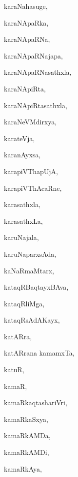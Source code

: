 \begin{multicols}{3}
{\noindent
{karaNahasuge}, \pageref{karaNahasuge}

\noindent
{karaNApaRka}, \pageref{karaNApaRka}

\noindent
{karaNApaRNa}, \pageref{karaNApaRNa}

\noindent
{karaNApaRNajapa}, \pageref{karaNApaRNajapa}

\noindent
{karaNApaRNasathxla}, \pageref{karaNApaRNasathxla}

\noindent
{karaNApiRta}, \pageref{karaNApiRta}

\noindent
{karaNApiRtasathxla}, \pageref{karaNApiRtasathxla}

\noindent
{karaNeVMdirxya}, \pageref{karaNeVMdirxya}

\noindent
{karateVja}, \pageref{karateVja}

\noindent
{karanAyxsa}, \pageref{karanAyxsa}

\noindent
{karapiVThapUjA}, \pageref{karapiVThapUjA}

\noindent
{karapiVThAcaRne}, \pageref{karapiVThAcaRne}

\noindent
{karasathxla}, \pageref{karasathxla}

\noindent
{karasathxLa}, \pageref{karasathxLa}

\noindent
{karuNajala}, \pageref{karuNajala}

\noindent
{karuNaparxsAda}, \pageref{karuNaparxsAda}

\noindent
{kaNaRmaMtarx}, \pageref{kaNaRmaMtarx}

\noindent
{kataqRBaqtayxBAva}, \pageref{kataqRBaqtayxBAva}

\noindent
{kataqRliMga}, \pageref{kataqRliMga}

\noindent
{kataqRsAdAKayx}, \pageref{kataqRsAdAKayx}

\noindent
{katARra}, \pageref{katARra}

\noindent
{katARrana kamamxTa}, \pageref{katARrana kamamxTa}

\noindent
{katuR}, \pageref{katuR}

\noindent
{kamaR}, \pageref{kamaR}

\noindent
{kamaRkaqtashariVri}, \pageref{kamaRkaqtashariVri}

\noindent
{kamaRkaSxya}, \pageref{kamaRkaSxya}

\noindent
{kamaRkAMDa}, \pageref{kamaRkAMDa}

\noindent
{kamaRkAMDi}, \pageref{kamaRkAMDi}

\noindent
{kamaRkAya}, \pageref{kamaRkAya}

}
\end{multicols}
